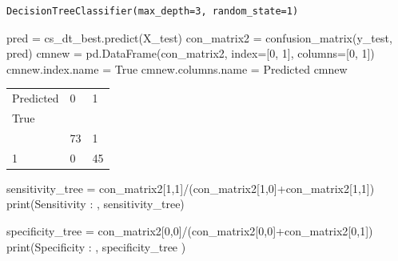 \documentclass[
  11pt,
  letterpaper,
  DIV=11,
  numbers=noendperiod]{scrartcl}
\newenvironment{Shaded}{\begin{snugshade}}{\end{snugshade}}
\newcommand{\BuiltInTok}[1]{\textcolor[rgb]{0.00,0.23,0.31}{#1}}
\newcommand{\DecValTok}[1]{\textcolor[rgb]{0.68,0.00,0.00}{#1}}
\newcommand{\NormalTok}[1]{\textcolor[rgb]{0.00,0.23,0.31}{#1}}
\newcommand{\OperatorTok}[1]{\textcolor[rgb]{0.37,0.37,0.37}{#1}}
\newcommand{\StringTok}[1]{\textcolor[rgb]{0.13,0.47,0.30}{#1}}
\begin{document}
\begin{verbatim}
DecisionTreeClassifier(max_depth=3, random_state=1)
\end{verbatim}

\begin{Shaded}
\begin{Highlighting}[]
\NormalTok{pred }\OperatorTok{=}\NormalTok{ cs\_dt\_best.predict(X\_test)}
\NormalTok{con\_matrix2 }\OperatorTok{=}\NormalTok{ confusion\_matrix(y\_test, pred)}
\NormalTok{cmnew }\OperatorTok{=}\NormalTok{ pd.DataFrame(con\_matrix2, index}\OperatorTok{=}\NormalTok{[}\StringTok{\textquotesingle{}0\textquotesingle{}}\NormalTok{, }\StringTok{\textquotesingle{}1\textquotesingle{}}\NormalTok{], columns}\OperatorTok{=}\NormalTok{[}\StringTok{\textquotesingle{}0\textquotesingle{}}\NormalTok{, }\StringTok{\textquotesingle{}1\textquotesingle{}}\NormalTok{])}
\NormalTok{cmnew.index.name }\OperatorTok{=} \StringTok{\textquotesingle{}True\textquotesingle{}}
\NormalTok{cmnew.columns.name }\OperatorTok{=} \StringTok{\textquotesingle{}Predicted\textquotesingle{}}
\NormalTok{cmnew}
\end{Highlighting}
\end{Shaded}

\begin{longtable}[]{@{}lll@{}}
\toprule\noalign{}
Predicted & 0 & 1 \\
True & & \\
\midrule\noalign{}
\endhead
\bottomrule\noalign{}
\endlastfoot
0 & 73 & 1 \\
1 & 0 & 45 \\
\end{longtable}

\begin{Shaded}
\begin{Highlighting}[]
\NormalTok{sensitivity\_tree }\OperatorTok{=}\NormalTok{ con\_matrix2[}\DecValTok{1}\NormalTok{,}\DecValTok{1}\NormalTok{]}\OperatorTok{/}\NormalTok{(con\_matrix2[}\DecValTok{1}\NormalTok{,}\DecValTok{0}\NormalTok{]}\OperatorTok{+}\NormalTok{con\_matrix2[}\DecValTok{1}\NormalTok{,}\DecValTok{1}\NormalTok{])}
\BuiltInTok{print}\NormalTok{(}\StringTok{\textquotesingle{}Sensitivity : \textquotesingle{}}\NormalTok{, sensitivity\_tree)}

\NormalTok{specificity\_tree }\OperatorTok{=}\NormalTok{ con\_matrix2[}\DecValTok{0}\NormalTok{,}\DecValTok{0}\NormalTok{]}\OperatorTok{/}\NormalTok{(con\_matrix2[}\DecValTok{0}\NormalTok{,}\DecValTok{0}\NormalTok{]}\OperatorTok{+}\NormalTok{con\_matrix2[}\DecValTok{0}\NormalTok{,}\DecValTok{1}\NormalTok{])}
\BuiltInTok{print}\NormalTok{(}\StringTok{\textquotesingle{}Specificity : \textquotesingle{}}\NormalTok{, specificity\_tree )}
\end{Highlighting}
\end{Shaded}
\end{document}
